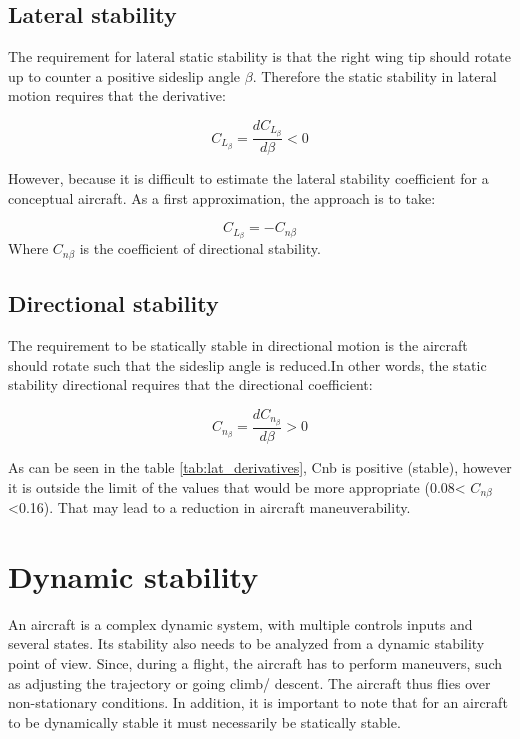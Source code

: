 \documentclass[english,fira]{ist-report}
\begin{document}
\subsection{Lateral stability}
The requirement for lateral static stability is that the right wing tip should rotate up to counter a positive sideslip angle $\beta$. Therefore the static stability in lateral motion requires that the derivative:

\begin{equation}
   C_{L_{\beta}} = \dfrac{dC_{L_\beta}}{d\beta} < 0 
    \label{eq. lat_moment coefficient}
\end{equation}

However, because it is difficult to estimate the lateral stability coefficient for a conceptual aircraft. As a first approximation, the approach is to take:

\begin{equation}
   C_{L_{\beta}} = -C_{n\beta}
\end{equation}
Where $C_{n\beta}$ is the coefficient of directional stability.

\subsection{Directional stability}
The requirement to be statically stable in directional motion is the aircraft should rotate such that the sideslip angle is reduced.In other words, the static stability directional requires that the directional coefficient:

\begin{equation}
   C_{n_{\beta}} = \dfrac{dC_{n_\beta}}{d\beta} > 0 
    \label{eq. dir_moment coefficient}
\end{equation}

As can be seen in the table \ref{tab:lat_derivatives}, Cnb is positive (stable), however it is outside the limit of the values that would be more appropriate (0.08< $C_{n\beta}$ <0.16). That may lead to a reduction in aircraft maneuverability.

\section{Dynamic stability}
An aircraft is a complex dynamic system, with multiple controls inputs and several states. Its stability also needs to be analyzed from a dynamic stability point of view. Since, during a flight, the aircraft has to perform maneuvers, such as adjusting the trajectory or going climb/ descent. The aircraft thus flies over non-stationary conditions. In addition, it is important to note that for an aircraft to be dynamically stable it must necessarily be statically stable.
\end{document}
